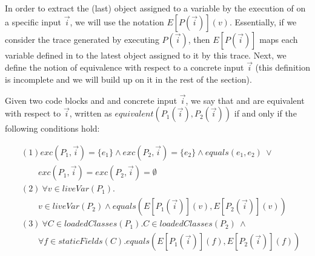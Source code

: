 \documentclass[sigconf,review,anonymous]{acmart}
\begin{document}

In order to extract the (last) object assigned to a variable  by the execution of  on a specific input $\vec{i}$,
we will use the notation $E[P(\vec{i})](v)$. Essentially, if we consider the trace generated by executing $P(\vec{i})$,
then $E[P(\vec{i})]$ maps each variable defined in  to the latest object assigned to it by this trace.
Next, we define the notion of equivalence with respect to a concrete input $\vec{i}$ (this definition is incomplete and we will build up on it in the rest of the section).

\begin{definition}\label{def:prog-equiv}
  Given two code blocks  and  and concrete input $\vec{i}$,
  we say that  and  are equivalent
  with respect to $\vec{i}$, written as $equivalent(P_1(\vec{i}), P_2(\vec{i}))$
  if and only if the following conditions hold:

\[
\begin{aligned}
  & (1) exc(P_1, \vec{i})=\{e_1\} \wedge exc(P_2, \vec{i})=\{e_2\} \wedge equals(e_1,e_2) ~\vee\\
  & \qquad exc(P_1, \vec{i})=exc(P_2, \vec{i}) =\emptyset \\ 
      & (2)~ \forall v\in liveVar(P_1). \\
      & \qquad v\in liveVar(P_2) \wedge equals(E[P_1(\vec{i})](v), E[P_2(\vec{i})](v))\\
& (3)~  \forall C \in loadedClasses(P_1). C \in loadedClasses(P_2)~ \wedge \\
  &  \qquad \forall f {\in} staticFields(C).equals(E[P_1(\vec{i})](f), E[P_2(\vec{i})](f))
    \end{aligned}
    \]
   
  \end{definition}
\end{document}
